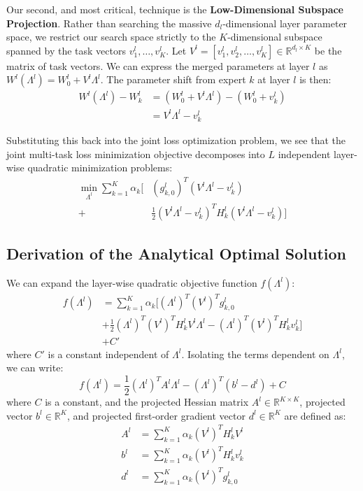 Our second, and most critical, technique is the \textbf{Low-Dimensional Subspace Projection}. Rather than searching the massive $d_l$-dimensional layer parameter space, we restrict our search space strictly to the $K$-dimensional subspace spanned by the task vectors $v_1^l, \dots, v_K^l$. Let $V^l = [v_1^l, v_2^l, \dots, v_K^l] \in \mathbb{R}^{d_l \times K}$ be the matrix of task vectors. We can express the merged parameters at layer $l$ as $W^l(\Lambda^l) = W_0^l + V^l \Lambda^l$. The parameter shift from expert $k$ at layer $l$ is then:
\begin{equation}
\begin{split}
    W^l(\Lambda^l) - W_k^l &= \left(W_0^l + V^l \Lambda^l\right) - \left(W_0^l + v_k^l\right) \\
    &= V^l \Lambda^l - v_k^l
\end{split}
\end{equation}

Substituting this back into the joint loss optimization problem, we see that the joint multi-task loss minimization objective decomposes into $L$ independent layer-wise quadratic minimization problems:
\begin{equation}
\begin{split}
    \min_{\Lambda^l} \sum_{k=1}^K \alpha_k \Big[ &(g_{k,0}^l)^T (V^l \Lambda^l - v_k^l) \\
    + &\frac{1}{2} \left(V^l \Lambda^l - v_k^l\right)^T H_k^l \left(V^l \Lambda^l - v_k^l\right) \Big]
\end{split}
\end{equation}

\subsection{Derivation of the Analytical Optimal Solution}
We can expand the layer-wise quadratic objective function $f(\Lambda^l)$:
\begin{equation}
\begin{split}
    f(\Lambda^l) &= \sum_{k=1}^K \alpha_k \Big[ (\Lambda^l)^T (V^l)^T g_{k,0}^l \\
    &+ \frac{1}{2} (\Lambda^l)^T (V^l)^T H_k^l V^l \Lambda^l - (\Lambda^l)^T (V^l)^T H_k^l v_k^l \Big] \\
    &+ C'
\end{split}
\end{equation}
where $C'$ is a constant independent of $\Lambda^l$. Isolating the terms dependent on $\Lambda^l$, we can write:
\begin{equation}
    f(\Lambda^l) = \frac{1}{2} (\Lambda^l)^T A^l \Lambda^l - (\Lambda^l)^T (b^l - d^l) + C
\end{equation}
where $C$ is a constant, and the projected Hessian matrix $A^l \in \mathbb{R}^{K \times K}$, projected vector $b^l \in \mathbb{R}^K$, and projected first-order gradient vector $d^l \in \mathbb{R}^K$ are defined as:
\begin{align}
    A^l &= \sum_{k=1}^K \alpha_k (V^l)^T H_k^l V^l \\
    b^l &= \sum_{k=1}^K \alpha_k (V^l)^T H_k^l v_k^l \\
    d^l &= \sum_{k=1}^K \alpha_k (V^l)^T g_{k,0}^l
\end{align}


